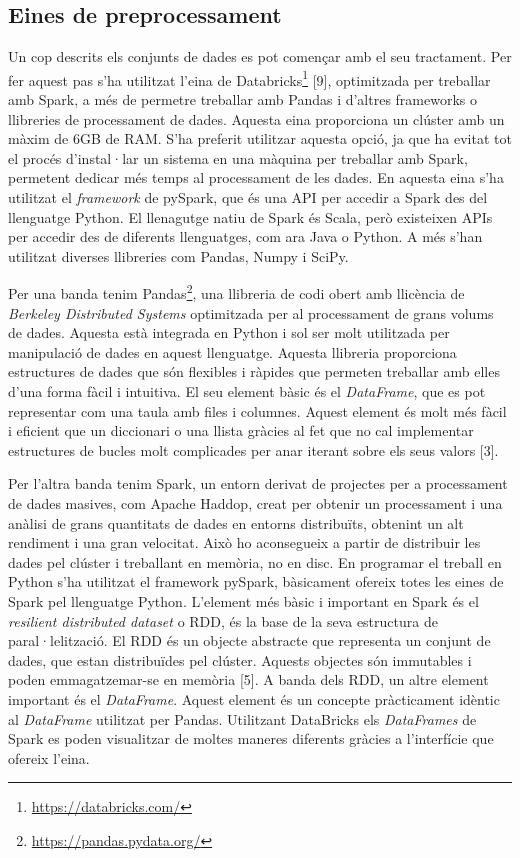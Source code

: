 \documentclass[10pt,a4paper,twocolumn,twoside]{article}
\begin{document}
\subsection{Eines de preprocessament}
Un cop descrits els conjunts de dades es pot començar amb el seu tractament. Per fer aquest pas s'ha utilitzat l'eina de Databricks\footnote{\url{https://databricks.com/}} [9], optimitzada per treballar amb Spark, a més de permetre treballar amb Pandas i d'altres frameworks o llibreries de processament de dades. Aquesta eina proporciona un clúster amb un màxim de 6GB de RAM. S'ha preferit utilitzar aquesta opció, ja que ha evitat tot el procés d'instal·lar un sistema en una màquina per treballar amb Spark, permetent dedicar més temps al processament de les dades. En aquesta eina s'ha utilitzat el \textit{framework} de pySpark, que és una API per accedir a Spark des del llenguatge Python. El llenagutge natiu de Spark és Scala, però existeixen APIs per accedir des de diferents llenguatges, com ara Java o Python. A més s'han utilitzat diverses llibreries com Pandas, Numpy i SciPy.

Per una banda tenim Pandas\footnote{\url{https://pandas.pydata.org/}}, una llibreria de codi obert amb llicència de \textit{Berkeley Distributed Systems} optimitzada per al processament de grans volums de dades. Aquesta està integrada en Python i sol ser molt utilitzada per manipulació de dades en aquest llenguatge. Aquesta llibreria proporciona estructures de dades que són flexibles i ràpides que permeten treballar amb elles d'una forma fàcil i intuitiva. El seu element bàsic és el \textit{DataFrame}, que es pot representar com una taula amb files i columnes. Aquest element és molt més fàcil i eficient que un diccionari o una llista gràcies al fet que no cal implementar estructures de bucles molt complicades per anar iterant sobre els seus valors [3].

Per l'altra banda tenim Spark, un entorn derivat de projectes per a processament de dades masives, com Apache Haddop, creat per obtenir un processament i una anàlisi de grans quantitats de dades en entorns distribuïts, obtenint un alt rendiment i una gran velocitat. Això ho aconsegueix a partir de distribuir les dades pel clúster i treballant en memòria, no en disc. En programar el treball en Python s'ha utilitzat el framework pySpark, bàsicament ofereix totes les eines de Spark pel llenguatge Python. L'element més bàsic i important en Spark és el \textit{resilient distributed dataset} o RDD, és la base de la seva estructura de paral·lelització. El RDD és un objecte abstracte que representa un conjunt de dades, que estan distribuïdes pel clúster. Aquests objectes són immutables i poden emmagatzemar-se en memòria [5]. A banda dels RDD, un altre element important és el \textit{DataFrame}. Aquest element és un concepte pràcticament idèntic al \textit{DataFrame} utilitzat per Pandas. Utilitzant DataBricks els \textit{DataFrames} de Spark es poden visualitzar de moltes maneres diferents gràcies a l'interfície que ofereix l'eina.
\end{document}

